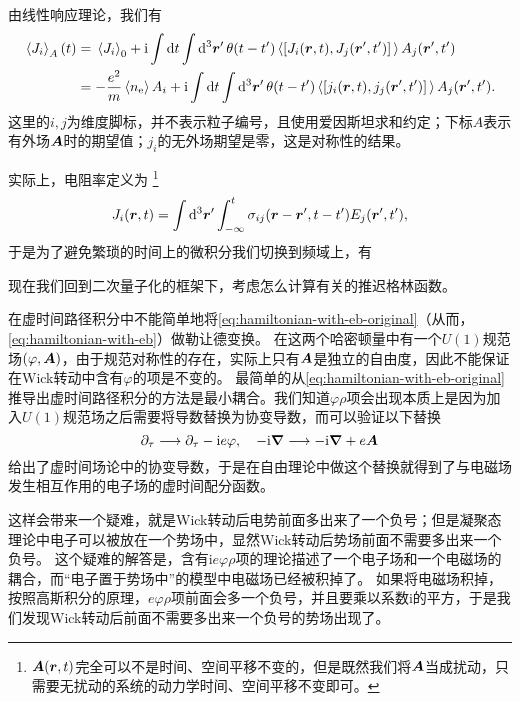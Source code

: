 \documentclass[hyperref, UTF8, a4paper]{ctexart}
\newcommand*{\ii}{\mathrm{i}}
\begin{document}
由线性响应理论，我们有
\[
    \begin{aligned}
        \expval*{{J}_i}_A (t) &= \expval*{{J}_i}_0 + \ii \int \dd{t} \int \dd[3]{\vb*{r}'} \theta(t-t') \expval*{\comm*{{J}_i(\vb*{r}, t)}{{J}_j(\vb*{r}', t')}} A_j(\vb*{r}', t') \\
        &= - \frac{e^2}{m} \expval*{{n}_\text{e}} A_i + \ii \int \dd{t} \int \dd[3]{\vb*{r}'} \theta(t-t') \expval*{\comm*{{j}_i(\vb*{r}, t)}{{j}_j(\vb*{r}', t')}} A_j(\vb*{r}', t').
    \end{aligned}
\]
这里的$i, j$为维度脚标，并不表示粒子编号，且使用爱因斯坦求和约定；下标$A$表示有外场$\vb*{A}$时的期望值；${j}_i$的无外场期望是零，这是对称性的结果。

实际上，电阻率定义为%
\footnote{$\vb*{A}(\vb*{r}, t)$完全可以不是时间、空间平移不变的，但是既然我们将$\vb*{A}$当成扰动，只需要无扰动的系统的动力学时间、空间平移不变即可。}%
\begin{equation}
    J_i(\vb*{r}, t) = \int \dd[3]{\vb*{r}'} \int_{-\infty}^t \sigma_{ij}(\vb*{r}-\vb*{r}', t - t') E_j(\vb*{r}', t'),
\end{equation}
于是为了避免繁琐的时间上的微积分我们切换到频域上，有

现在我们回到二次量子化的框架下，考虑怎么计算有关的推迟格林函数。

在虚时间路径积分中不能简单地将\eqref{eq:hamiltonian-with-eb-original}（从而，\eqref{eq:hamiltonian-with-eb}）做勒让德变换。
在这两个哈密顿量中有一个$U(1)$规范场$(\varphi, \vb*{A})$，由于规范对称性的存在，实际上只有$\vb*{A}$是独立的自由度，因此不能保证在Wick转动中含有$\varphi$的项是不变的。
最简单的从\eqref{eq:hamiltonian-with-eb-original}推导出虚时间路径积分的方法是最小耦合。我们知道$\varphi \rho$项会出现本质上是因为加入$U(1)$规范场之后需要将导数替换为协变导数，而可以验证以下替换
\begin{equation}
    \partial_\tau \longrightarrow \partial_\tau - \ii e \varphi, \quad - \ii \grad \longrightarrow - \ii \grad + e \vb*{A} 
\end{equation}
给出了虚时间场论中的协变导数，于是在自由理论中做这个替换就得到了与电磁场发生相互作用的电子场的虚时间配分函数。

这样会带来一个疑难，就是Wick转动后电势前面多出来了一个负号；但是凝聚态理论中电子可以被放在一个势场中，显然Wick转动后势场前面不需要多出来一个负号。
这个疑难的解答是，含有$\ii e \varphi \rho$项的理论描述了一个电子场和一个电磁场的耦合，而“电子置于势场中”的模型中电磁场已经被积掉了。
如果将电磁场积掉，按照高斯积分的原理，$e \varphi \rho$项前面会多一个负号，并且要乘以系数$\ii$的平方，于是我们发现Wick转动后前面不需要多出来一个负号的势场出现了。
\end{document}
